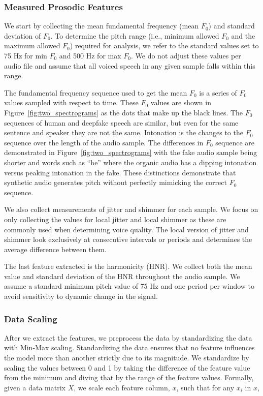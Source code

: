 \documentclass[10pt, journal, anonymous=true]{IEEEtran}
\begin{document}
\subsubsection{Measured Prosodic Features} 
We start by collecting the mean fundamental frequency (mean $F_0$) and standard deviation of $F_0$. To determine the pitch range (i.e., minimum allowed $F_0$ and the maximum allowed $F_0$) required for analysis, we refer to the standard values set to 75 Hz for min $F_0$ and 500 Hz for max $F_0$. We do not adjust these values per audio file and assume that all voiced speech in any given sample falls within this range. 

The fundamental frequency sequence used to get the mean $F_0$ is a series of $F_0$ values sampled with respect to time. These $F_0$ values are shown in Figure~\ref{fig:two_spectrograms} as the dots that make up the black lines. The $F_0$ sequences of human and deepfake speech are similar, but even for the same sentence and speaker they are not the same. Intonation is the changes to the $F_0$ sequence over the length of the audio sample. The differences in $F_0$ sequence are demonstrated in Figure~\ref{fig:two_spectrograms} with the fake audio sample being shorter and words such as ``he'' where the organic audio has a dipping intonation versus peaking intonation in the fake. These distinctions demonstrate that synthetic audio generates pitch without perfectly mimicking the correct $F_0$ sequence. 

We also collect measurements of jitter and shimmer for each sample. We focus on only collecting the values for local jitter and local shimmer as these are commonly used when determining voice quality. The local version of jitter and shimmer look exclusively at consecutive intervals or periods and determines the average difference between them.

The last feature extracted is the harmonicity (HNR). We collect both the mean value and standard deviation of the HNR throughout the audio sample. We assume a standard minimum pitch value of 75 Hz and one period per window to avoid sensitivity to dynamic change in the signal.

\subsubsection{Data Scaling}
After we extract the features, we preprocess the data by standardizing 
the data with Min-Max scaling. Standardizing the data ensures that no feature influences the model 
more than another strictly due to its magnitude. We standardize by scaling the values between 0 and 1 
by taking the difference of the feature value from the minimum and diving that by the range of the feature values.
Formally, given a data matrix $X$, we scale each feature column, $x$, such that for any $x_i$ in
$x$, 
\end{document}
